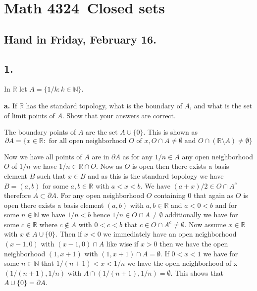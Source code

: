 \documentclass{amsart}
\theoremstyle{plain}
\theoremstyle{definition}
\theoremstyle{remark}
\begin{document}
\section*{Math 4324\  Closed sets } 

\subsection*{Hand in Friday, February 16.} 




\vspace{.15in}
\noindent
\subsection*{1.} In $\mathbb R$ let $A = \{ 1/k : k\in \mathbb N \}$.

\vspace{.1in}
{\bfseries a.} If $\mathbb R$ has the standard topology, what is the boundary of $A$, and what is the set of limit points of $A$. Show that your answers are correct. 
    
The boundary points of $A$ are the set $A\cup \{0\}$. This is shown as \[\partial A=\{x\in \mathbb{R}: \text{ for all open neighborhood } O \text{  of } x, O\cap A\not = \emptyset \text{ and } O\cap (\mathbb{R}\setminus A)\not = \emptyset\}\]

Now we have all points of $A$ are in $\partial A$ as for any $1/n\in A$ any open neighborhood $O$ of $1/n$ we have $1/n\in \mathbb{R}\cap O$. Now as $O$ is open then there exists a basis element $B$ such that $x\in B$ and as this is the standard topology we have $B=(a,b)$ for some $a,b\in \mathbb{R}$ with $a<x<b$. We have  $(a+x)/2 \in O \cap A^c $ therefore $A\subset \partial A$. For any open neighborhood $O$ containing $0$ that again as $O$ is open there exists a basis element $(a,b)$ with $a,b\in \mathbb{R}$ and $a<0<b$ and for some $n\in \mathbb{N}$ we have $1/n<b$ hence $1/n\in O\cap A\not = \emptyset$ additionally we have for some $c\in \mathbb{R}$ where $c\not \in A$ with $0<c<b$ that $c\in O\cap A^c\not = \emptyset$. Now assume $x\in \mathbb{R}$ with $x\not \in A\cup \{0\}$. Then if $x<0$ we immediately have an open neighborhood $(x-1,0)$ with $(x-1,0)\cap A$ like wise if $x>0$ then we have the open neighborhood $(1,x+1) $ with $(1,x+1)\cap A=\emptyset$. If $0<x<1$ we have for some $n\in \mathbb{N}$ that $1/(n+1)<x<1/n$ we have the open neighborhood of x $(1/(n+1),1/n)$ with $A\cap (1/(n+1),1/n)=\emptyset$. This shows that $A\cup \{0\}=\partial A$.      
\end{document}
